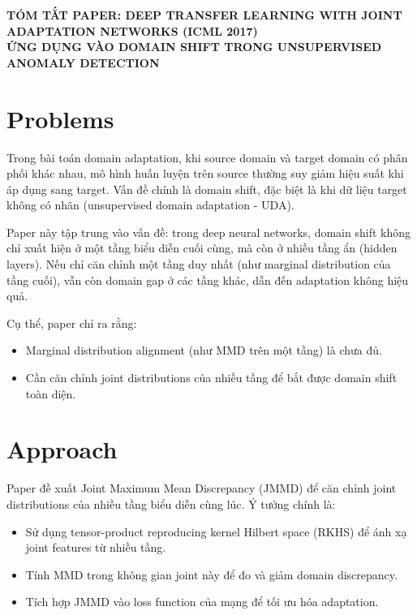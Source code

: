 \documentclass[a4paper]{article}
\begin{document}
\begin{center}
    \textbf{\Large TÓM TẮT PAPER: DEEP TRANSFER LEARNING WITH JOINT ADAPTATION NETWORKS (ICML 2017)}\\[0.2cm]
    \textbf{\Large ỨNG DỤNG VÀO DOMAIN SHIFT TRONG UNSUPERVISED ANOMALY DETECTION}
\end{center}

\section{Problems}

Trong bài toán domain adaptation, khi source domain và target domain có phân phối khác nhau, mô hình huấn luyện trên source thường suy giảm hiệu suất khi áp dụng sang target. Vấn đề chính là domain shift, đặc biệt là khi dữ liệu target không có nhãn (unsupervised domain adaptation - UDA).

Paper này tập trung vào vấn đề: trong deep neural networks, domain shift không chỉ xuất hiện ở một tầng biểu diễn cuối cùng, mà còn ở nhiều tầng ẩn (hidden layers). Nếu chỉ căn chỉnh một tầng duy nhất (như marginal distribution của tầng cuối), vẫn còn domain gap ở các tầng khác, dẫn đến adaptation không hiệu quả.

Cụ thể, paper chỉ ra rằng:
\begin{itemize}
    \item Marginal distribution alignment (như MMD trên một tầng) là chưa đủ.
    \item Cần căn chỉnh joint distributions của nhiều tầng để bắt được domain shift toàn diện.
\end{itemize}

\section{Approach}

Paper đề xuất Joint Maximum Mean Discrepancy (JMMD) để căn chỉnh joint distributions của nhiều tầng biểu diễn cùng lúc. Ý tưởng chính là:
\begin{itemize}
    \item Sử dụng tensor-product reproducing kernel Hilbert space (RKHS) để ánh xạ joint features từ nhiều tầng.
    \item Tính MMD trong không gian joint này để đo và giảm domain discrepancy.
    \item Tích hợp JMMD vào loss function của mạng để tối ưu hóa adaptation.
\end{itemize}
\end{document}

